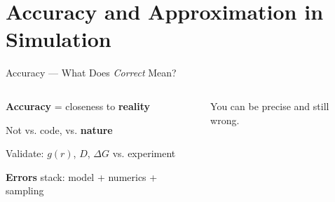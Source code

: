 \section{Accuracy and Approximation in Simulation}

\begin{frame}{Accuracy --- What Does \textit{Correct} Mean?}
	\begin{columns}[T,onlytextwidth]
		\begin{pitemize}
			\item \textbf{Accuracy} = closeness to \textbf{reality}
			\item Not vs. code, vs. \textbf{nature}
			\item Validate: $g(r)$, $D$, $\Delta G$ vs. experiment
			\item \textbf{Errors} stack: model + numerics + sampling
		\end{pitemize}
		\vspace{2mm}
		{\footnotesize\color{softgray} You can be precise and still wrong.}
	\end{columns}
\end{frame}

